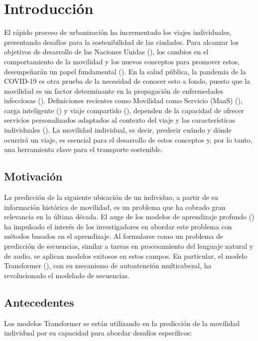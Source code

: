 \chapter*{Introducción}\label{chapter:introduction}

El rápido proceso de urbanización ha incrementado los viajes 
individuales, presentando desafíos para la sostenibilidad de las 
ciudades. Para alcanzar los objetivos de desarrollo de las 
Naciones Unidas (\cite{Griggs2013}), los cambios en el comportamiento de 
la movilidad y los nuevos conceptos para promover estos, 
desempeñarán un papel fundamental
 (\cite{Martin2021}). En la salud p\'ublica, la pandemia de la COVID-19 es otra prueba
de la necesidad de conocer esto a fondo, puesto
que la movilidad es un factor determinante en la propagación
de enfermedades infecciosas  (\cite{Kraemer2020}). Definiciones recientes como
Movilidad como
Servicio (MaaS) (\cite{Reck2022}), carga inteligente (\cite{Xu2018}) y 
viaje compartido (\cite{Huang2019}), dependen de la capacidad de ofrecer 
servicios personalizados adaptados al contexto del viaje y las 
características individuales (\cite{Ma2022}).
La movilidad individual, es decir, predecir cuándo y dónde ocurrirá 
un viaje, es esencial para el desarrollo de estos conceptos y, 
por lo tanto, una herramienta clave para el transporte sostenible.

\section{Motivación}
La predicción de la siguiente ubicación de un individuo, a partir 
de su información histórica de movilidad, es un problema que ha cobrado 
gran relevancia en la última década. El auge de los modelos de 
aprendizaje profundo (\cite{luca2021survey}) ha impulsado el interés de 
los investigadores en abordar este problema con métodos basados 
en el aprendizaje.  Al formularse como un problema de predicción 
de secuencias, similar a tareas en procesamiento del lenguaje 
natural y de audio, se aplican modelos exitosos en estos campos.  
En particular, el modelo Transformer (\cite{vaswani2017attention}), con su mecanismo 
de autoatención multicabezal, ha revolucionado el modelado de 
secuencias.
\newpage
\section{Antecedentes}

Los modelos Transformer se están utilizando en la predicción de la 
movilidad individual por su capacidad para abordar desafíos 
específicos: 

